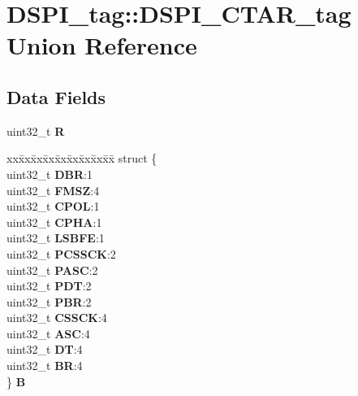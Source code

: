 \hypertarget{unionDSPI__tag_1_1DSPI__CTAR__tag}{}\section{D\+S\+P\+I\+\_\+tag\+::D\+S\+P\+I\+\_\+\+C\+T\+A\+R\+\_\+tag Union Reference}
\label{unionDSPI__tag_1_1DSPI__CTAR__tag}
\subsection*{Data Fields}
\begin{DoxyCompactItemize}
\item 
\mbox{\label{unionDSPI__tag_1_1DSPI__CTAR__tag_a8c933ebb339ead843643e87028b3fa1c}} 
uint32\+\_\+t {\bfseries R}
\item 
\mbox{\label{unionDSPI__tag_1_1DSPI__CTAR__tag_a6cc5c46c7764a75f8f5854b16f50e9e0}} 
\begin{tabbing}
xx\=xx\=xx\=xx\=xx\=xx\=xx\=xx\=xx\=\kill
struct \{\\
\>uint32\_t {\bfseries DBR}:1\\
\>uint32\_t {\bfseries FMSZ}:4\\
\>uint32\_t {\bfseries CPOL}:1\\
\>uint32\_t {\bfseries CPHA}:1\\
\>uint32\_t {\bfseries LSBFE}:1\\
\>uint32\_t {\bfseries PCSSCK}:2\\
\>uint32\_t {\bfseries PASC}:2\\
\>uint32\_t {\bfseries PDT}:2\\
\>uint32\_t {\bfseries PBR}:2\\
\>uint32\_t {\bfseries CSSCK}:4\\
\>uint32\_t {\bfseries ASC}:4\\
\>uint32\_t {\bfseries DT}:4\\
\>uint32\_t {\bfseries BR}:4\\
\} {\bfseries B}\\


\end{tabbing}
\end{DoxyCompactItemize}
